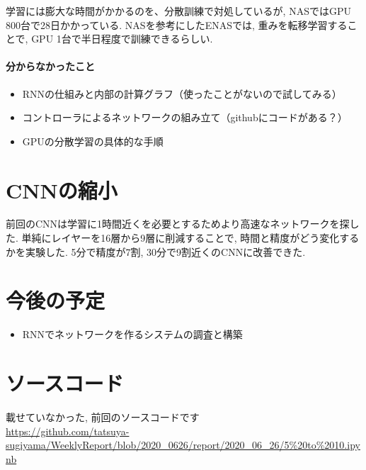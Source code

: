 \documentclass[twocolumn]{jarticle}     %
\begin{document}
学習には膨大な時間がかかるのを、分散訓練で対処しているが, NASではGPU 800台で28日かかっている.
NASを参考にしたENASでは, 重みを転移学習することで, GPU 1台で半日程度で訓練できるらしい.

\paragraph{分からなかったこと}
\begin{itemize}
  \item RNNの仕組みと内部の計算グラフ（使ったことがないので試してみる）
  \item コントローラによるネットワークの組み立て（githubにコードがある？）
  \item GPUの分散学習の具体的な手順
\end{itemize}

\section{CNNの縮小}
前回のCNNは学習に1時間近くを必要とするためより高速なネットワークを探した.
単純にレイヤーを16層から9層に削減することで, 時間と精度がどう変化するかを実験した.
5分で精度が7割, 30分で9割近くのCNNに改善できた.

\section{今後の予定}
\begin{itemize}
	\item {RNNでネットワークを作るシステムの調査と構築}
\end{itemize}


\section{ソースコード}
載せていなかった, 前回のソースコードです\\
\url{https://github.com/tatsuya-sugiyama/WeeklyReport/blob/2020_0626/report/2020_06_26/5%20to%2010.ipynb}




\end{document}
